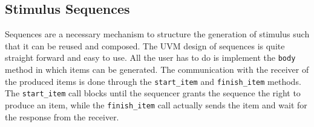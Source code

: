\documentclass[11pt,a4paper]{report}
\newcommand{\ttt}{\texttt}
\begin{document}

\subsection{Stimulus Sequences} %
\label{sec:stimulus_sequences}

Sequences are a necessary mechanism to structure the generation of stimulus such that it can be reused and composed.
The UVM design of sequences is quite straight forward and easy to use. All the user has to do is implement the
\ttt{body} method in which items can be generated. The communication with the receiver of the produced items is done
through the \ttt{start\_item} and \ttt{finish\_item} methods. The \ttt{start\_item} call blocks until the sequencer
grants the sequence the right to produce an item, while the \ttt{finish\_item} call actually sends the item and wait
for the response from the receiver.
\end{document}
